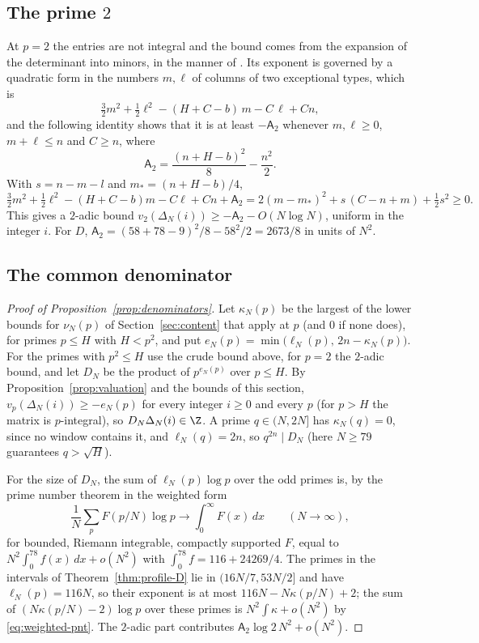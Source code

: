\subsection{The prime $2$}
At $p=2$ the entries are not integral and the bound comes from the expansion of the determinant into
minors, in the manner of \cite[\S3]{OpenAI2026}. Its exponent is governed by a quadratic form in the
numbers $m,\ell$ of columns of two exceptional types, which is
\[
 \tfrac32m^2+\tfrac12\ell^2-(H+C-b)\,m-C\,\ell+Cn ,
\]
and the following identity shows that it is at least $-\mathsf A_2$ whenever $m,\ell\ge0$,
$m+\ell\le n$ and $C\ge n$, where
\begin{equation}\label{eq:A2}
 \mathsf A_2=\frac{(n+H-b)^2}8-\frac{n^2}2 .
\end{equation}
With $s=n-m-l$ and $m_*=(n+H-b)/4$,
\[
 \tfrac32m^2+\tfrac12\ell^2-(H+C-b)m-C\ell+Cn+\mathsf A_2
 =2(m-m_*)^2+s\,(C-n+m)+\tfrac12s^2\ge0 .
\]
This gives a $2$-adic bound $v_2(\Delta_N(i))\ge-\mathsf A_2-O(N\log N)$, uniform in the integer $i$. For $D$,
$\mathsf A_2=(58+78-9)^2/8-58^2/2=2673/8$ in units of $N^2$.

\subsection{The common denominator}
\begin{proof}[Proof of Proposition~\ref{prop:denominators}]
Let $\kappa_N(p)$ be the largest of the lower bounds for $\nu_N(p)$ of Section~\ref{sec:content} that apply at
$p$ (and $0$ if none does), for primes $p\le H$ with $H<p^2$, and put $e_N(p)=\min\bigl(\ell_N(p),\,2n-\kappa_N(p)\bigr)$. For the
primes with $p^2\le H$ use the crude bound above, for $p=2$ the $2$-adic bound, and let $D_N$ be the
product of $p^{e_N(p)}$ over $p\le H$. By Proposition~\ref{prop:valuation} and the bounds of this section,
$v_p(\Delta_N(i))\ge-e_N(p)$ for every integer $i\ge0$ and every $p$ (for $p>H$ the matrix is
$p$-integral), so $D_N\Delta_N(i)\in\Z$. A prime $q\in(N,2N]$ has $\kappa_N(q)=0$, since no window
contains it, and $\ell_N(q)=2n$, so $q^{2n}\mid D_N$ (here $N\ge79$ guarantees $q>\sqrt H$).

For the size of $D_N$, the sum of $\ell_N(p)\log p$ over the odd primes is, by the prime number theorem in
the weighted form
\begin{equation}\label{eq:weighted-pnt}
 \frac1N\sum_{p}F(p/N)\log p\longrightarrow\int_0^\infty F(x)\,dx\qquad(N\to\infty),
\end{equation}
for bounded, Riemann integrable, compactly supported $F$, equal to $N^2\int_0^{78}f(x)\,dx+o(N^2)$ with
$\int_0^{78}f=116+24269/4$. The primes in the intervals of Theorem~\ref{thm:profile-D} lie in
$(16N/7,53N/2]$ and have $\ell_N(p)=116N$, so their exponent is at most $116N-N\kappa(p/N)+2$; the sum of
$(N\kappa(p/N)-2)\log p$ over these primes is $N^2\int\kappa+o(N^2)$ by \eqref{eq:weighted-pnt}. The $2$-adic part contributes
$\mathsf A_2\log2\,N^2+o(N^2)$.
\end{proof}

